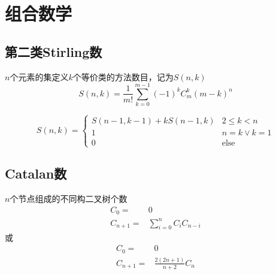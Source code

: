 \section{组合数学}

\subsection{第二类Stirling数}
$n$个元素的集定义$k$个等价类的方法数目，记为$S(n,k)$
\begin{displaymath}
S(n, k) = \frac{1}{m!}\sum_{k=0}^{m-1}{(-1)^k C_m^k (m-k)^n}
\end{displaymath}

\begin{displaymath}
S(n, k) = 
\begin{cases}
S(n-1, k-1) + kS(n-1, k) & 2\leqslant k < n\\
1 & n=k \vee k=1 \\
0 & \text{else}
\end{cases}
\end{displaymath}
$$ $$


\subsection{Catalan数}
$n$个节点组成的不同构二叉树个数
\begin{align*}
C_0     = & 0 \\
C_{n+1} = & \sum_{i=0}^n C_i C_{n-i}
\end{align*}
或
\begin{align*}
C_0     = & 0 \\
C_{n+1} = & \frac{2(2n+1)}{n+2} C_n
\end{align*}
